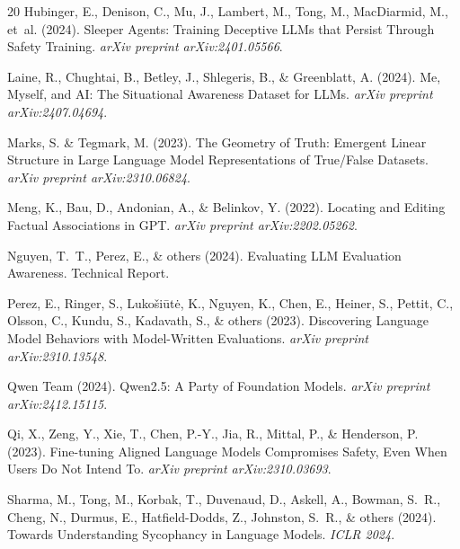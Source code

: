 \documentclass[11pt,a4paper]{article}
\begin{document}
\begin{thebibliography}{20}
Hubinger, E., Denison, C., Mu, J., Lambert, M., Tong, M., MacDiarmid, M., et~al. (2024).
\newblock Sleeper Agents: Training Deceptive LLMs that Persist Through Safety Training.
\newblock \textit{arXiv preprint arXiv:2401.05566}.

Laine, R., Chughtai, B., Betley, J., Shlegeris, B., \& Greenblatt, A. (2024).
\newblock Me, Myself, and AI: The Situational Awareness Dataset for LLMs.
\newblock \textit{arXiv preprint arXiv:2407.04694}.

Marks, S. \& Tegmark, M. (2023).
\newblock The Geometry of Truth: Emergent Linear Structure in Large Language
Model Representations of True/False Datasets.
\newblock \textit{arXiv preprint arXiv:2310.06824}.

Meng, K., Bau, D., Andonian, A., \& Belinkov, Y. (2022).
\newblock Locating and Editing Factual Associations in GPT.
\newblock \textit{arXiv preprint arXiv:2202.05262}.

Nguyen, T.~T., Perez, E., \& others (2024).
\newblock Evaluating LLM Evaluation Awareness.
\newblock Technical Report.

Perez, E., Ringer, S., Luko\v{s}i\=ut\.e, K., Nguyen, K., Chen, E.,
Heiner, S., Pettit, C., Olsson, C., Kundu, S., Kadavath, S., \& others (2023).
\newblock Discovering Language Model Behaviors with Model-Written Evaluations.
\newblock \textit{arXiv preprint arXiv:2310.13548}.

Qwen Team (2024).
\newblock Qwen2.5: A Party of Foundation Models.
\newblock \textit{arXiv preprint arXiv:2412.15115}.

Qi, X., Zeng, Y., Xie, T., Chen, P.-Y., Jia, R., Mittal, P., \& Henderson, P. (2023).
\newblock Fine-tuning Aligned Language Models Compromises Safety, Even When Users Do Not Intend To.
\newblock \textit{arXiv preprint arXiv:2310.03693}.

Sharma, M., Tong, M., Korbak, T., Duvenaud, D., Askell, A., Bowman, S.~R.,
Cheng, N., Durmus, E., Hatfield-Dodds, Z., Johnston, S.~R., \& others (2024).
\newblock Towards Understanding Sycophancy in Language Models.
\newblock \textit{ICLR 2024}.


\end{thebibliography}
\end{document}
